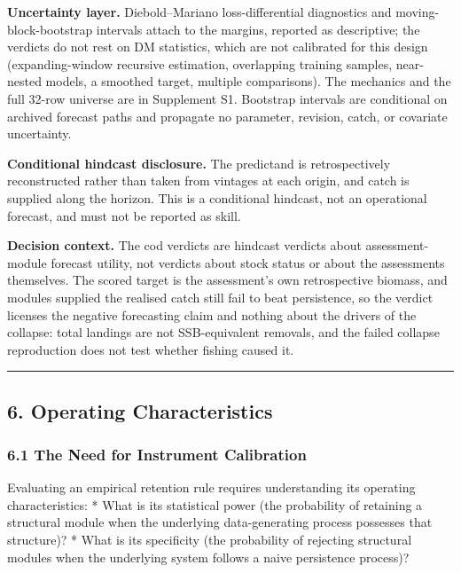 \documentclass[11pt]{article}
\begin{document}
\textbf{Uncertainty layer.} Diebold--Mariano loss-differential
diagnostics and moving-block-bootstrap intervals attach to the margins,
reported as descriptive; the verdicts do not rest on DM statistics,
which are not calibrated for this design (expanding-window recursive
estimation, overlapping training samples, near-nested models, a smoothed
target, multiple comparisons). The mechanics and the full 32-row
universe are in Supplement S1. Bootstrap intervals are conditional on
archived forecast paths and propagate no parameter, revision, catch, or
covariate uncertainty.

\textbf{Conditional hindcast disclosure.} The predictand is
retrospectively reconstructed rather than taken from vintages at each
origin, and catch is supplied along the horizon. This is a conditional
hindcast, not an operational forecast, and must not be reported as
skill.

\textbf{Decision context.} The cod verdicts are hindcast verdicts about
assessment-module forecast utility, not verdicts about stock status or
about the assessments themselves. The scored target is the assessment's
own retrospective biomass, and modules supplied the realised catch still
fail to beat persistence, so the verdict licenses the negative
forecasting claim and nothing about the drivers of the collapse: total
landings are not SSB-equivalent removals, and the failed collapse
reproduction does not test whether fishing caused it.

\begin{center}\rule{0.5\linewidth}{0.5pt}\end{center}

\subsection{6. Operating
Characteristics}\label{operating-characteristics}

\subsubsection{6.1 The Need for Instrument
Calibration}\label{the-need-for-instrument-calibration}

Evaluating an empirical retention rule requires understanding its
operating characteristics: * What is its statistical power (the
probability of retaining a structural module when the underlying
data-generating process possesses that structure)? * What is its
specificity (the probability of rejecting structural modules when the
underlying system follows a naive persistence process)?
\end{document}

